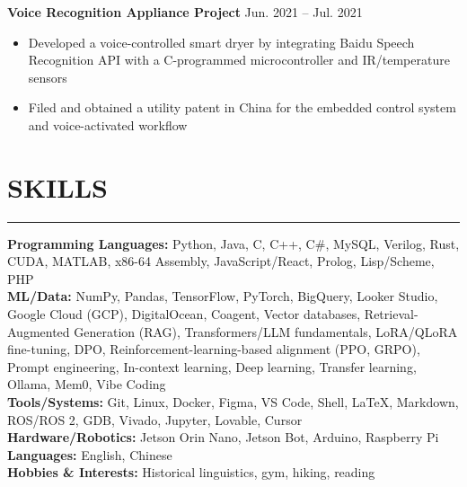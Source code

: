 \documentclass[letterpaper,10pt]{article}
\begin{document}
\textbf{Voice Recognition Appliance Project} \hfill Jun. 2021 – Jul. 2021  
\begin{itemize}[leftmargin=*]
    \item Developed a voice-controlled smart dryer by integrating Baidu Speech Recognition API with a C-programmed microcontroller and IR/temperature sensors
    \item Filed and obtained a utility patent in China for the embedded control system and voice-activated workflow
\end{itemize}


	
	\section*{SKILLS}
	\hrule
	
    \textbf{Programming Languages:} Python, Java, C, C++, C\#, MySQL, Verilog, Rust, CUDA, MATLAB, x86-64 Assembly, JavaScript/React, Prolog, Lisp/Scheme, PHP\\
    \textbf{ML/Data:} NumPy, Pandas, TensorFlow, PyTorch, BigQuery, Looker Studio, Google Cloud (GCP), DigitalOcean, Coagent, Vector databases, Retrieval-Augmented Generation (RAG), Transformers/LLM fundamentals, LoRA/QLoRA fine-tuning, DPO, Reinforcement-learning-based alignment (PPO, GRPO), Prompt engineering, In-context learning, Deep learning, Transfer learning, Ollama, Mem0, Vibe Coding\\
    \textbf{Tools/Systems:} Git, Linux, Docker, Figma, VS Code, Shell, \LaTeX, Markdown, ROS/ROS 2, GDB, Vivado, Jupyter, Lovable, Cursor\\
    \textbf{Hardware/Robotics:} Jetson Orin Nano, Jetson Bot, Arduino, Raspberry Pi\\
    \textbf{Languages:} English, Chinese\\
    \textbf{Hobbies \& Interests:} Historical linguistics, gym, hiking, reading
    	
\end{document}
